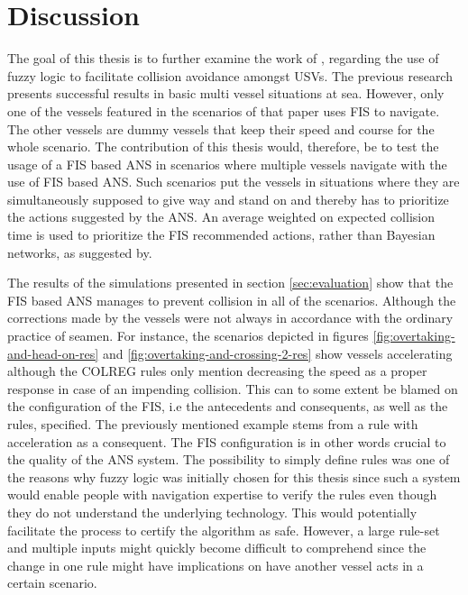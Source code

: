 \chapter{Discussion}%
\label{chap:disc}
The goal of this thesis is to further examine the work of \textcite{perera2012intelligent}, regarding the use of fuzzy logic to facilitate collision avoidance amongst USVs. The previous research presents successful results in
basic multi vessel situations at sea. However, only one of the vessels featured in the scenarios of that paper uses FIS to navigate. The other vessels
are dummy vessels that keep their speed and course for the whole scenario.
The contribution of this thesis would, therefore, be to test the usage of a FIS
based ANS in scenarios where multiple vessels navigate with the use of FIS
based ANS. Such scenarios put the vessels in situations where they are simultaneously supposed to give way and stand on and thereby has to prioritize the actions suggested by the ANS. An average weighted on expected collision time is used to prioritize the FIS recommended actions, rather
than Bayesian networks, as suggested by\textcite{perera2012intelligent}.

The results of the simulations presented in section \ref{sec:evaluation} show that the FIS based ANS manages to prevent collision in all of the scenarios. Although the corrections made by the vessels were not always in accordance with the ordinary practice of seamen. For instance, the scenarios depicted in figures \ref{fig:overtaking-and-head-on-res} and \ref{fig:overtaking-and-crossing-2-res} show vessels accelerating although the COLREG rules only mention decreasing the speed as a proper response in case of an impending collision. This can to some extent be blamed on the configuration of the FIS, i.e the  antecedents and consequents, as well as the rules, specified. The previously mentioned example stems from a rule with acceleration as a consequent.  The FIS configuration is in other words crucial to the quality of the ANS system. The possibility to simply define rules was one of the reasons why fuzzy logic was initially chosen for this thesis since such a system would enable people with navigation expertise to verify the rules even though they do not understand the underlying technology. This would potentially facilitate the process to certify the algorithm as safe. However, a large rule-set  and multiple inputs might quickly become difficult to comprehend since the change in one rule might have implications on have another vessel acts in a certain scenario.





